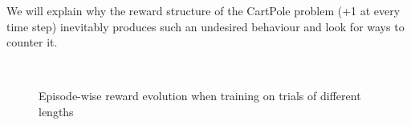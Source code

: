 We will explain why the reward structure of the CartPole problem (+1 at
every time step) inevitably produces such an undesired behaviour and look
for ways to counter it.
\begin{figure}
	\centering
	\\
	\caption{Episode-wise reward evolution when training on trials of 
	different lengths}
	\label{fig:20permsLR_training}
\end{figure}

